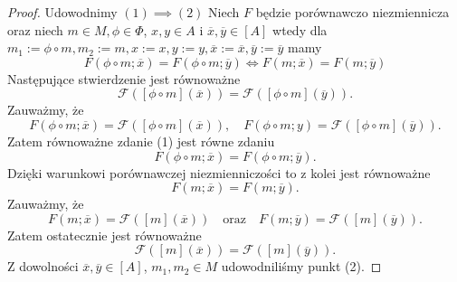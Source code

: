 \documentclass[12pt,a4paper]{report}
\newcommand{\domkniecie}[1]{\left[ {#1} \right] }
\begin{document}
\begin{proof}
Udowodnimy $(1) \implies (2)$
Niech $F$ będzie porównawczo niezmiennicza oraz niech $m\in M, \phi \in \Phi$, $x, y \in A$ i $\overline{x}, \overline{y} \in \domkniecie{A}$ wtedy dla $m_1:=\phi\circ m, m_2:=m, x:=x, y:=y, \overline{x}:=\overline{x}, \overline{y}:=\overline{y}$ mamy 
$$
F(\phi\circ m;\overline{x})=F(\phi\circ m;\overline{y}) \iff F(m;\overline{x})=F(m;\overline{y})
$$
Następujące stwierdzenie jest równoważne
\begin{equation}
\mathcal{F}(\domkniecie{\phi \circ m}(\overline{x}))=\mathcal{F}(\domkniecie{\phi \circ m}(\overline{y})).
\end{equation}
Zauważmy, że
$$
F(\phi \circ m;\overline{x})=\mathcal{F}( \domkniecie{\phi \circ m}(\overline{x})), \quad F(\phi \circ m;y)=\mathcal{F}(\domkniecie{\phi\circ m}(\overline{y})).
$$
Zatem równoważne zdanie (1) jest równe zdaniu
$$
F(\phi\circ m;\overline{x})=F(\phi \circ m;\overline{y}).
$$
Dzięki warunkowi porównawczej niezmienniczości to z kolei jest równoważne
$$
F(m;\overline{x})=F(m;\overline{y}).
$$
Zauważmy, że 
$$
F(m;\overline{x})=\mathcal{F}(\domkniecie{m}(\overline{x})) \quad \textrm{oraz} \quad F(m;\overline{y})=\mathcal{F}(\domkniecie{m}(\overline{y})).
$$
Zatem ostatecznie jest równoważne 
$$
\mathcal{F}(\domkniecie{m}(\overline{x}))=\mathcal{F}(\domkniecie{m}(\overline{y})).
$$
Z dowolności $\overline{x}, \overline{y} \in \domkniecie{A}$, $m_1, m_2 \in M$ udowodniliśmy punkt (2).


\end{proof}
\end{document}
